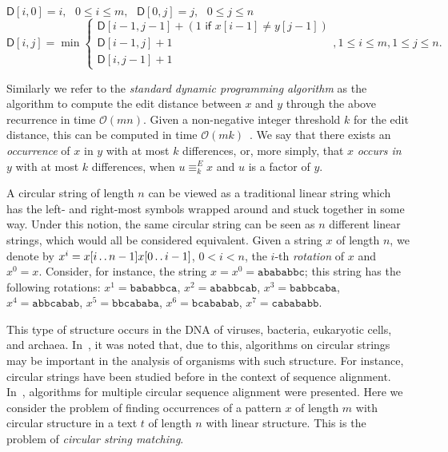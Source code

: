 \documentclass[runningheads, envcountsame, a4paper]{llncs}\usepackage{etex}
\def\dd{\mathinner{.\,.}}
\newcommand{\cO}{\mathcal{O}}
\begin{document}
\noindent$\textsf{D}[i,0] = i,\textrm{ }0\leq i\leq m,\textrm{ }\textsf{D}[0,j] = j,\textrm{ }0\leq j\leq n$
\[ \textsf{D}[i,j] =\min \left\{
  \begin{array}{l}
    \textsf{D}[i-1,j-1]  + (1 \textsf{ if } x[i-1]\neq y[j-1])\\
\textsf{D}[i-1,j] + 1 \\
\textsf{D}[i,j-1] + 1 
  \end{array} \right. , 1\leq i\leq m, 1\leq j\leq n.\]

\noindent Similarly we refer to the \textit{standard dynamic programming algorithm} as the algorithm to compute the 
edit distance between $x$ and $y$ through the above recurrence in time $\cO(mn)$. 
Given a non-negative integer threshold $k$ for the edit distance, this can be computed in time $\cO(mk)$~\cite{editd}.
We say that there exists an \textit{occurrence} of $x$ in $y$ with at most $k$ differences, or, more simply, that $x$
\textit{occurs in} $y$ with at most $k$ differences, when $u \equiv_k^E x$ and $u$ is a factor of $y$.

A circular string of length $n$ can be viewed as a traditional linear string which has the left- and right-most symbols 
wrapped around and stuck together in some way. Under this notion, the same circular string can be seen as $n$ different 
linear strings, which would all be considered equivalent. Given a string $x$ of length $n$, we denote 
by $x^{i}=x[i \dd n-1]x[0 \dd i-1]$, $0 < i < n$, the $i$-th \textit{rotation} of $x$ and $x^{0}=x$.
Consider, for instance, the string $x=x^{0}=\texttt{abababbc}$; this string has the following rotations:
$x^{1}=\texttt{bababbca}$, $x^{2}=\texttt{ababbcab}$, $x^{3}=\texttt{babbcaba}$, $x^{4}=\texttt{abbcabab}$, 
$x^{5}=\texttt{bbcababa}$, $x^{6}=\texttt{bcababab}$, $x^{7}=\texttt{cabababb}$.

This type of structure occurs in the DNA of viruses, bacteria, 
eukaryotic cells, and archaea. In~\cite{G97}, it was noted that, due to this, algorithms on 
circular strings may be important in the analysis of organisms with such structure. For instance, circular strings have been studied before 
in the context of sequence alignment. In~\cite{Lee:2010:FOA:1875737.1875765,circ09}, algorithms for multiple circular 
sequence alignment were presented. Here we consider the problem of finding occurrences of a pattern $x$ of length $m$ with circular structure 
in a text $t$ of length $n$ with linear structure. 
This is the problem of \emph{circular string matching}.
\end{document}
